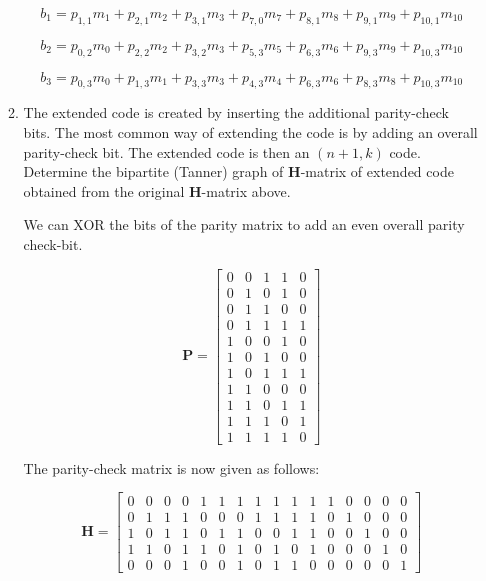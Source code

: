 \documentclass[fleqn]{article}
\begin{document}
\begin{enumerate}
\begin{enumerate}
			\begin{equation*}
				b_1 = p_{1,1}m_{1} + p_{2,1}m_{2} + p_{3,1}m_{3} + p_{7,0}m_{7} + p_{8,1}m_{8} + p_{9,1}m_{9} + p_{10,1}m_{10}
			\end{equation*}
			
			\begin{equation*}
				b_2 = p_{0,2}m_{0} + p_{2,2}m_{2} + p_{3,2}m_{3} + p_{5,3}m_{5} + p_{6,3}m_{6} + p_{9,3}m_{9} + p_{10,3}m_{10}
			\end{equation*}
			
			\begin{equation*}
				b_3 = p_{0,3}m_{0} + p_{1,3}m_{1} + p_{3,3}m_{3} + p_{4,3}m_{4} + p_{6,3}m_{6} + p_{8,3}m_{8} + p_{10,3}m_{10}
			\end{equation*}
			
			\item The extended code is created by inserting the additional parity-check bits. The most common way of extending the code is by adding an overall parity-check bit. The extended code is then an $(n+1,k)$ code. Determine the bipartite (Tanner) graph of $\mathbf{H}$-matrix of extended code obtained from the original $\mathbf{H}$-matrix above.
			
			We can XOR the bits of the parity matrix to add an even overall parity check-bit.
			
			\begin{equation*}
				\mathbf{P} = \begin{bmatrix}
					0 & 0 & 1 & 1 & 0 \\
					0 & 1 & 0 & 1 & 0 \\
					0 & 1 & 1 & 0 & 0 \\
					0 & 1 & 1 & 1 & 1 \\
					1 & 0 & 0 & 1 & 0 \\
					1 & 0 & 1 & 0 & 0 \\
					1 & 0 & 1 & 1 & 1 \\
					1 & 1 & 0 & 0 & 0 \\
					1 & 1 & 0 & 1 & 1 \\
					1 & 1 & 1 & 0 & 1 \\
					1 & 1 & 1 & 1 & 0
				\end{bmatrix}
			\end{equation*}
			
			The parity-check matrix is now given as follows:
			
			\begin{equation*}
				\mathbf{H} = \begin{bmatrix}
					0 & 0 & 0 & 0 & 1 & 1 & 1 & 1 & 1 & 1 & 1 & 1 & 0 & 0 & 0 & 0\\
					0 & 1 & 1 & 1 & 0 & 0 & 0 & 1 & 1 & 1 & 1 & 0 & 1 & 0 & 0 & 0\\
					1 & 0 & 1 & 1 & 0 & 1 & 1 & 0 & 0 & 1 & 1 & 0 & 0 & 1 & 0 & 0\\
					1 & 1 & 0 & 1 & 1 & 0 & 1 & 0 & 1 & 0 & 1 & 0 & 0 & 0 & 1 & 0\\
					0 & 0 & 0 & 1 & 0 & 0 & 1 & 0 & 1 & 1 & 0 & 0 & 0 & 0 & 0 & 1
				\end{bmatrix}
			\end{equation*}


\end{enumerate}
\end{enumerate}
\end{document}
